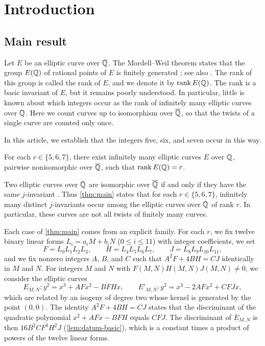 \chapter{Introduction}\label{sec:introduction}

\section{Main result}\label{sec:intro-main}

Let $E$ be an elliptic curve over $\mathbb Q$. The Mordell--Weil theorem states that the group $E(\mathbb Q)$ of rational points of $E$ is finitely generated \cite{Mordell1922,Weil1929}; see also \cite[Theorem~VIII.6.7]{SilvermanAEC}. The rank of this group is called the rank of $E$, and we denote it by $\operatorname{rank} E(\mathbb Q)$. The rank is a basic invariant of $E$, but it remains poorly understood. In particular, little is known about which integers occur as the rank of infinitely many elliptic curves over $\mathbb Q$. Here we count curves up to isomorphism over $\overline{\mathbb Q}$, so that the twists of a single curve are counted only once.

In this article, we establish that the integers five, six, and seven occur in this way.

\begin{theorem}\label{thm:main}
For each $r\in\{5,6,7\}$, there exist infinitely many elliptic curves $E$ over $\mathbb Q$, pairwise nonisomorphic over $\overline{\mathbb Q}$, such that $\operatorname{rank} E(\mathbb Q)=r$.
\end{theorem}

Two elliptic curves over $\mathbb Q$ are isomorphic over $\overline{\mathbb Q}$ if and only if they have the same $j$-invariant \cite[Proposition~III.1.4(b)]{SilvermanAEC}. Thus \cref{thm:main} states that for each $r\in\{5,6,7\}$, infinitely many distinct $j$-invariants occur among the elliptic curves over $\mathbb Q$ of rank $r$. In particular, these curves are not all twists of finitely many curves.

Each case of \cref{thm:main} comes from an explicit family. For each $r$, we fix twelve binary linear forms $L_i=a_iM+b_iN$ ($0\le i\le 11$) with integer coefficients, we set
\begin{equation*}
F=L_0L_1L_2L_3,\qquad H=L_4L_5L_6L_7,\qquad J=L_8L_9L_{10}L_{11},
\end{equation*}
and we fix nonzero integers $A$, $B$, and $C$ such that $A^2F+4BH=CJ$ identically in $M$ and $N$. For integers $M$ and $N$ with $F(M,N)H(M,N)J(M,N)\ne0$, we consider the elliptic curves
\begin{equation}\label{eq:intro-curves}
E_{M,N}\colon y^2=x^3+AFx^2-BFHx,\qquad E'_{M,N}\colon y^2=x^3-2AFx^2+CFJx,
\end{equation}
which are related by an isogeny of degree two whose kernel is generated by the point $(0,0)$. The identity $A^2F+4BH=CJ$ states that the discriminant of the quadratic polynomial $x^2+AFx-BFH$ equals $CFJ$. The discriminant of $E_{M,N}$ is then $16B^2CF^3H^2J$ (\cref{lem:datum-basic}), which is a constant times a product of powers of the twelve linear forms.

